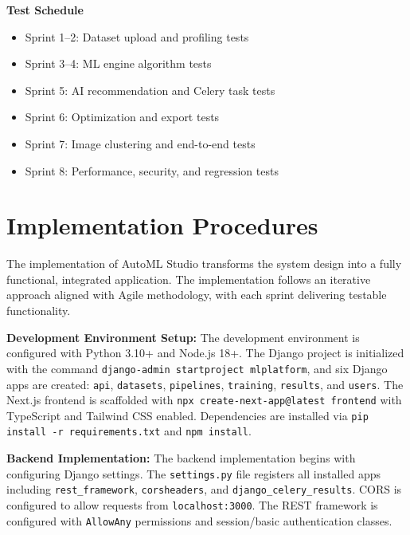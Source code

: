 \documentclass[12pt,a4paper]{report}
\begin{document}
\textbf{Test Schedule}
\begin{itemize}
    \item Sprint 1--2: Dataset upload and profiling tests
    \item Sprint 3--4: ML engine algorithm tests
    \item Sprint 5: AI recommendation and Celery task tests
    \item Sprint 6: Optimization and export tests
    \item Sprint 7: Image clustering and end-to-end tests
    \item Sprint 8: Performance, security, and regression tests
\end{itemize}

\setcounter{chapter}{6}
\clearpage
\thispagestyle{empty}

\noindent
{}

\clearpage
{}
\setcounter{section}{0}

\section{Implementation Procedures}

The implementation of AutoML Studio transforms the system design into a fully functional, integrated application. The implementation follows an iterative approach aligned with Agile methodology, with each sprint delivering testable functionality.

\textbf{Development Environment Setup:}
The development environment is configured with Python 3.10+ and Node.js 18+. The Django project is initialized with the command \texttt{django-admin startproject mlplatform}, and six Django apps are created: \texttt{api}, \texttt{datasets}, \texttt{pipelines}, \texttt{training}, \texttt{results}, and \texttt{users}. The Next.js frontend is scaffolded with \texttt{npx create-next-app@latest frontend} with TypeScript and Tailwind CSS enabled. Dependencies are installed via \texttt{pip install -r requirements.txt} and \texttt{npm install}.

\textbf{Backend Implementation:}
The backend implementation begins with configuring Django settings. The \texttt{settings.py} file registers all installed apps including \texttt{rest\_framework}, \texttt{corsheaders}, and \texttt{django\_celery\_results}. CORS is configured to allow requests from \texttt{localhost:3000}. The REST framework is configured with \texttt{AllowAny} permissions and session/basic authentication classes.
\end{document}
